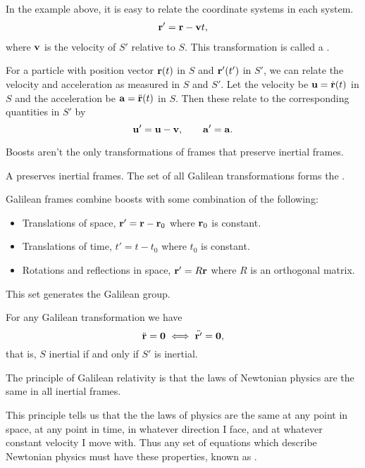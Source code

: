 \documentclass[a4paper]{scrartcl}
\begin{document}
In the example above, it is easy to relate the coordinate systems in each system.
\begin{align*}
	\mathbf{r}' = \mathbf{r} - \mathbf{v}t,
\end{align*}
where $\mathbf{v}$ is the velocity of $S'$ relative to $S$. This transformation is called a .

For a particle with position vector $\mathbf{r}(t)$ in $S$ and $\mathbf{r}'(t')$ in $S'$, we can relate the velocity and acceleration as measured in $S$ and $S'$. Let the velocity be $\mathbf{u} = \dot{\mathbf{r}}(t)$ in $S$ and the acceleration be $\mathbf{a} = \ddot{\mathbf{r}}(t)$ in $S$. Then these relate to the corresponding quantities in $S'$ by
$$
\mathbf{u}' = \mathbf{u} - \mathbf{v}, \quad \quad \mathbf{a}' = \mathbf{a}.
$$

Boosts aren't the only transformations of frames that preserve inertial frames.

\begin{definition}
	A  preserves inertial frames.
	The set of all Galilean transformations forms the .
\end{definition}

Galilean frames combine boosts with some combination of the following:
\begin{itemize}
	\item Translations of space, $\mathbf{r}' = \mathbf{r} - \mathbf{r}_0$ where $\mathbf{r}_0$ is constant.
	\item Translations of time, $t' = t - t_0$ where $t_0$ is constant.
	\item Rotations and reflections in space, $\mathbf{r}' = R \mathbf{r}$ where $R$ is an orthogonal matrix.
\end{itemize}
This set generates the Galilean group.

For any Galilean transformation we have
$$
\ddot{\mathbf{r}} = \mathbf{0} \iff \ddot{\mathbf{r}'} = \mathbf{0},
$$
that is, $S$ inertial if and only if $S'$ is inertial.

\begin{law*}
	The principle of Galilean relativity is that the laws of Newtonian physics are the same in all inertial frames.
\end{law*}

This principle tells us that the the laws of physics are the same at any point in space, at any point in time, in whatever direction I face, and at whatever constant velocity I move with. Thus any set of equations which describe Newtonian physics must have these properties, known as . 
\end{document}
